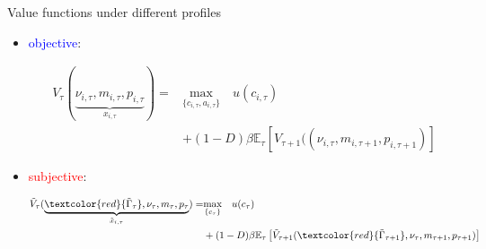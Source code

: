 \documentclass{beamer}
\begin{document}
\begin{frame}{Value functions under different profiles}
	\begin{itemize}
		\item \textcolor{blue}{objective}: 
		
		\begin{equation*}
			\begin{split}
				V_{\tau}(\underbrace{\nu_{i,\tau}, m_{i,\tau}, p_{i,\tau}}_{x_{i,\tau}})  =  & \underset{\{c_{i,\tau},a_{i,\tau}\}}{\textrm{max}} \quad   u(c_{i,\tau}) \\
				& +  (1-D)\beta \mathbb{E}_{\tau}\left[V_{\tau+1}((\nu_{i,\tau},m_{i,\tau+1}, p_{i,\tau+1})\right] 
			\end{split}
		\end{equation*}
		\item \textcolor{red}{subjective}: 
		
		\begin{equation*}
			\begin{split}
				\tilde V_{\tau}(\underbrace{\textcolor{red}{\tilde \Gamma_\tau}, \nu_\tau, m_\tau, p_\tau}_{\tilde x_{i,\tau}}) = & \underset{\{c_\tau\}}{\textrm{max}} \quad  u(c_\tau) \\
				&  + (1-D)\beta \mathbb{E}_{\tau}\left[\tilde V_{\tau+1}(\textcolor{red}{\tilde \Gamma_{\tau+1}}, \nu_\tau,m_{\tau+1}, p_{\tau+1})\right] 
			\end{split}
		\end{equation*}
	\end{itemize}
\end{frame}
\end{document}
